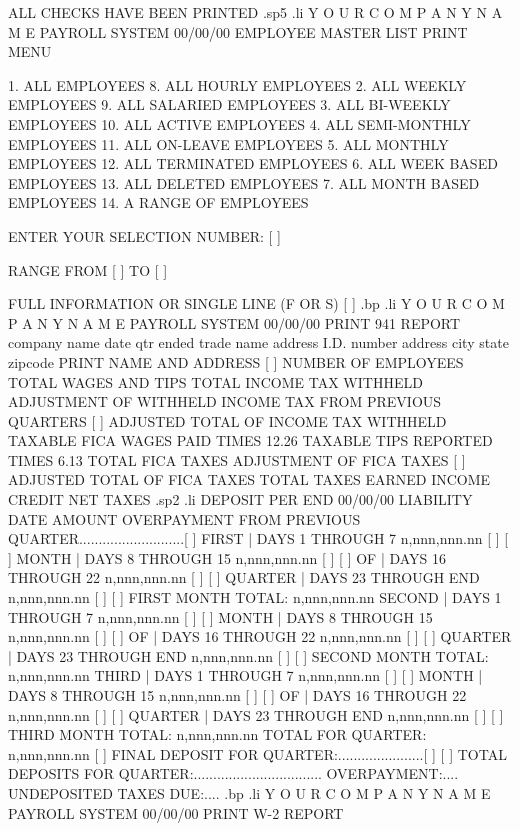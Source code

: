 		       ALL CHECKS HAVE BEEN PRINTED
.sp5
.li
		    Y O U R    C O M P A N Y	N A M E
			      PAYROLL SYSTEM
  00/00/00	      EMPLOYEE MASTER LIST PRINT MENU

       1. ALL EMPLOYEES 		   8. ALL HOURLY EMPLOYEES
       2. ALL WEEKLY EMPLOYEES		   9. ALL SALARIED EMPLOYEES
       3. ALL BI-WEEKLY EMPLOYEES	  10. ALL ACTIVE EMPLOYEES
       4. ALL SEMI-MONTHLY EMPLOYEES	  11. ALL ON-LEAVE EMPLOYEES
       5. ALL MONTHLY EMPLOYEES 	  12. ALL TERMINATED EMPLOYEES
       6. ALL WEEK BASED EMPLOYEES	  13. ALL DELETED EMPLOYEES
       7. ALL MONTH BASED EMPLOYEES	  14. A RANGE OF EMPLOYEES

		  ENTER YOUR SELECTION NUMBER: [  ]

		  RANGE FROM [	   ] TO [     ]

		  FULL INFORMATION OR SINGLE LINE (F OR S) [ ]
.bp
.li
	      Y O U R	 C O M P A N Y	  N  A M E
			 PAYROLL SYSTEM
  00/00/00		PRINT 941 REPORT
		company name				date qtr ended
		trade name
		address 				I.D. number
		address
		city		      state  zipcode
		PRINT NAME AND ADDRESS	[ ]
NUMBER OF EMPLOYEES
TOTAL WAGES AND TIPS
TOTAL INCOME TAX WITHHELD
ADJUSTMENT OF WITHHELD INCOME TAX FROM PREVIOUS QUARTERS    [		   ]
ADJUSTED TOTAL OF INCOME TAX WITHHELD
TAXABLE FICA WAGES PAID 		    TIMES 12.26%
TAXABLE TIPS REPORTED			    TIMES  6.13%
TOTAL FICA TAXES
ADJUSTMENT OF FICA TAXES				    [		   ]
ADJUSTED TOTAL OF FICA TAXES
TOTAL TAXES
EARNED INCOME CREDIT
NET TAXES
.sp2
.li
DEPOSIT PER END  00/00/00	 LIABILITY	   DATE 	AMOUNT
OVERPAYMENT FROM PREVIOUS QUARTER...........................[		 ]
 FIRST	 | DAYS 1 THROUGH 7	 n,nnn,nnn.nn	[	 ]  [		 ]
 MONTH	 | DAYS 8 THROUGH 15	 n,nnn,nnn.nn	[	 ]  [		 ]
 OF	 | DAYS 16 THROUGH 22	 n,nnn,nnn.nn	[	 ]  [		 ]
 QUARTER | DAYS 23 THROUGH END	 n,nnn,nnn.nn	[	 ]  [		 ]
   FIRST MONTH TOTAL:		 n,nnn,nnn.nn
 SECOND  | DAYS 1 THROUGH 7	 n,nnn,nnn.nn	[	 ]  [		 ]
 MONTH	 | DAYS 8 THROUGH 15	 n,nnn,nnn.nn	[	 ]  [		 ]
 OF	 | DAYS 16 THROUGH 22	 n,nnn,nnn.nn	[	 ]  [		 ]
 QUARTER | DAYS 23 THROUGH END	 n,nnn,nnn.nn	[	 ]  [		 ]
   SECOND MONTH TOTAL:		 n,nnn,nnn.nn
 THIRD	 | DAYS 1 THROUGH 7	 n,nnn,nnn.nn	[	 ]  [		 ]
 MONTH	 | DAYS 8 THROUGH 15	 n,nnn,nnn.nn	[	 ]  [		 ]
 OF	 | DAYS 16 THROUGH 22	 n,nnn,nnn.nn	[	 ]  [		 ]
 QUARTER | DAYS 23 THROUGH END	 n,nnn,nnn.nn	[	 ]  [		 ]
   THIRD MONTH TOTAL:		 n,nnn,nnn.nn
TOTAL FOR QUARTER:		 n,nnn,nnn.nn		    [		 ]
FINAL DEPOSIT FOR QUARTER:......................[	 ]  [		 ]
TOTAL DEPOSITS FOR QUARTER:.................................
OVERPAYMENT:....		  UNDEPOSITED TAXES DUE:....
.bp
.li
		     Y O U R	C O M P A N Y	 N A M E
			       PAYROLL SYSTEM
 00/00/00		      PRINT W-2 REPORT

